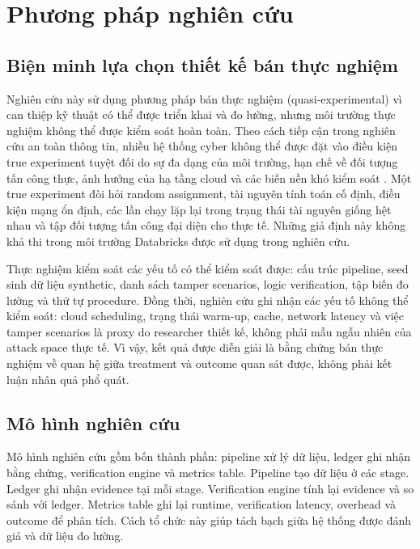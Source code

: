 \section{Phương pháp nghiên cứu}

\subsection{Biện minh lựa chọn thiết kế bán thực nghiệm}

Nghiên cứu này sử dụng phương pháp bán thực nghiệm (quasi-experimental) vì can thiệp kỹ thuật có thể được triển khai và đo lường, nhưng môi trường thực nghiệm không thể được kiểm soát hoàn toàn. Theo cách tiếp cận trong nghiên cứu an toàn thông tin, nhiều hệ thống cyber không thể được đặt vào điều kiện true experiment tuyệt đối do sự đa dạng của môi trường, hạn chế về đối tượng tấn công thực, ảnh hưởng của hạ tầng cloud và các biến nền khó kiểm soát \cite{edgar2017research}. Một true experiment đòi hỏi random assignment, tài nguyên tính toán cố định, điều kiện mạng ổn định, các lần chạy lặp lại trong trạng thái tài nguyên giống hệt nhau và tập đối tượng tấn công đại diện cho thực tế. Những giả định này không khả thi trong môi trường Databricks được sử dụng trong nghiên cứu.

Thực nghiệm kiểm soát các yếu tố có thể kiểm soát được: cấu trúc pipeline, seed sinh dữ liệu synthetic, danh sách tamper scenarios, logic verification, tập biến đo lường và thứ tự procedure. Đồng thời, nghiên cứu ghi nhận các yếu tố không thể kiểm soát: cloud scheduling, trạng thái warm-up, cache, network latency và việc tamper scenarios là proxy do researcher thiết kế, không phải mẫu ngẫu nhiên của attack space thực tế. Vì vậy, kết quả được diễn giải là bằng chứng bán thực nghiệm về quan hệ giữa treatment và outcome quan sát được, không phải kết luận nhân quả phổ quát.

\subsection{Mô hình nghiên cứu}

Mô hình nghiên cứu gồm bốn thành phần: pipeline xử lý dữ liệu, ledger ghi nhận bằng chứng, verification engine và metrics table. Pipeline tạo dữ liệu ở các stage. Ledger ghi nhận evidence tại mỗi stage. Verification engine tính lại evidence và so sánh với ledger. Metrics table ghi lại runtime, verification latency, overhead và outcome để phân tích. Cách tổ chức này giúp tách bạch giữa hệ thống được đánh giá và dữ liệu đo lường.

